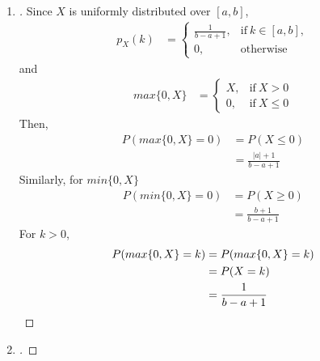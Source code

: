 \documentclass[paper=usletter, fontsize=12pt]{article}
\begin{document}
\begin{enumerate}
        \item
        \begin{proof}[\unskip\nopunct]
            Since $X$ is uniformly distributed over $[a, b]$,
            \begin{align*}
                p_X(k) & =
                \begin{cases}
                    \frac{1}{b-a+1}, & \text{if}\ k \in [a,b],\\
                    0, & \text{otherwise}
                \end{cases}
            \end{align*}
            and
            \begin{align*}
                max\{0,X\} & =
                \begin{cases}
                    X, & \text{if}\ X > 0\\
                    0, & \text{if}\ X \le 0
                \end{cases}
            \end{align*}
            Then,
            \begingroup
            \addtolength{\jot}{1em}
            \begin{align*}
                P(max\{0,X\} = 0) & = P(X \le 0)\\
                & = \frac{|a| + 1}{b - a + 1}
            \end{align*}
            \endgroup
            Similarly, for $min\{0,X\}$
            \begingroup
            \addtolength{\jot}{1em}
            \begin{align*}
                P(min\{0,X\} = 0) & = P(X \ge 0)\\
                & = \frac{b + 1}{b - a + 1}
            \end{align*}
            \endgroup
            For $k > 0$,
            \begingroup
            \addtolength{\jot}{1em}
            \begin{align*}
                P(max\{0,X\} = k) & = P(max\{0,X\} = k)\\
                & = P(X = k)\\
                & = \frac{1}{b - a + 1} \qedhere
            \end{align*}
            \endgroup
        \end{proof}
        \vspace{0.2in}

        \item
        \begin{proof}[\unskip\nopunct]


\end{proof}
\end{enumerate}
\end{document}
